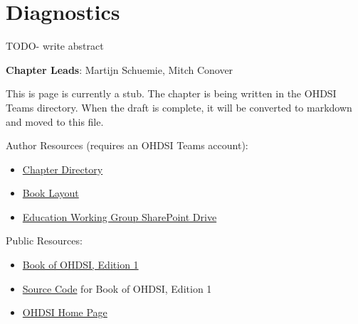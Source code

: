 \documentclass[
  letterpaper,
  paper=7in:10in,
  pagesize=pdftex,
  headinclude=on,
  footinclude=on,
  12pt]{scrbook}
\providecommand{\tightlist}{%
  \setlength{\itemsep}{0pt}\setlength{\parskip}{0pt}}\usepackage{longtable,booktabs,array}
\begin{document}
\chapter{Diagnostics}\label{sec-quality-diagnostics}

TODO- write abstract

\hfill\break

\textbf{Chapter Leads}: Martijn Schuemie, Mitch Conover

\begin{tcolorbox}[enhanced jigsaw, opacitybacktitle=0.6, coltitle=black, colback=white, bottomrule=.15mm, bottomtitle=1mm, title=\textcolor{quarto-callout-note-color}{\faInfo}\hspace{0.5em}{Note}, titlerule=0mm, rightrule=.15mm, colbacktitle=quarto-callout-note-color!10!white, colframe=quarto-callout-note-color-frame, toptitle=1mm, arc=.35mm, left=2mm, breakable, opacityback=0, leftrule=.75mm, toprule=.15mm]

This is page is currently a stub. The chapter is being written in the
OHDSI Teams directory. When the draft is complete, it will be converted
to markdown and moved to this file.

Author Resources (requires an OHDSI Teams account):

\begin{itemize}
\tightlist
\item
  \href{https://ohdsiorg.sharepoint.com/sites/Workgroup-EducationWorkingGroup/Shared\%20Documents/Forms/AllItems.aspx?id=\%2Fsites\%2FWorkgroup\%2DEducationWorkingGroup\%2FShared\%20Documents\%2FSection\%20IV\%20\%2D\%20Quality\%2FChapter\%2019\%20\%2D\%20Diagnostics&viewid=05fec2cc\%2Dec8a\%2D4d04\%2Db565\%2Dcf1289b96f67}{Chapter
  Directory}
\item
  \href{https://ohdsiorg.sharepoint.com/:x:/r/sites/Workgroup-EducationWorkingGroup/_layouts/15/Doc2.aspx?action=edit&sourcedoc=\%7B1fa31e39-1c5f-4918-b878-609ebd9810b3\%7D&wdOrigin=TEAMS-WEB.teamsSdk_ns.rwc&wdExp=TEAMS-TREATMENT&wdhostclicktime=1748104477731&web=1}{Book
  Layout}
\item
  \href{https://ohdsiorg.sharepoint.com/sites/Workgroup-EducationWorkingGroup/Shared\%20Documents/Forms/AllItems.aspx?viewid=05fec2cc\%2Dec8a\%2D4d04\%2Db565\%2Dcf1289b96f67}{Education
  Working Group SharePoint Drive}
\end{itemize}

Public Resources:

\begin{itemize}
\tightlist
\item
  \href{https://ohdsi.github.io/TheBookOfOhdsi/}{Book of OHDSI, Edition
  1}
\item
  \href{https://github.com/OHDSI/TheBookOfOhdsi}{Source Code} for Book
  of OHDSI, Edition 1
\item
  \href{https://ohdsi.org/}{OHDSI Home Page}
\end{itemize}

\end{tcolorbox}
\end{document}

